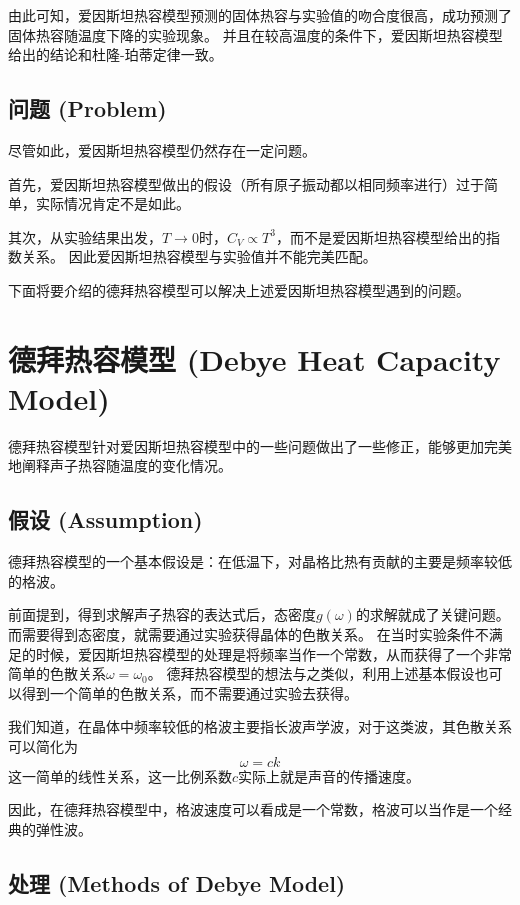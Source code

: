 \documentclass[declarePage]{ecnuthesis}
\begin{document}
由此可知，爱因斯坦热容模型预测的固体热容与实验值的吻合度很高，成功预测了固体热容随温度下降的实验现象。%
并且在较高温度的条件下，爱因斯坦热容模型给出的结论和杜隆-珀蒂定律一致。

\subsection{问题 (Problem)}

尽管如此，爱因斯坦热容模型仍然存在一定问题。

首先，爱因斯坦热容模型做出的假设（所有原子振动都以相同频率进行）过于简单，实际情况肯定不是如此。

其次，从实验结果出发，$T \rightarrow 0$时，$C_V \propto T^3$，而不是爱因斯坦热容模型给出的指数关系。%
因此爱因斯坦热容模型与实验值并不能完美匹配。

下面将要介绍的德拜热容模型可以解决上述爱因斯坦热容模型遇到的问题。

\section{德拜热容模型 (Debye Heat Capacity Model)}

德拜热容模型针对爱因斯坦热容模型中的一些问题做出了一些修正，能够更加完美地阐释声子热容随温度的变化情况。

\subsection{假设 (Assumption)}

德拜热容模型的一个基本假设是：在低温下，对晶格比热有贡献的主要是频率较低的格波。

前面提到，得到求解声子热容的表达式后，态密度$g(\omega)$的求解就成了关键问题。%
而需要得到态密度，就需要通过实验获得晶体的色散关系。%
在当时实验条件不满足的时候，爱因斯坦热容模型的处理是将频率当作一个常数，从而获得了一个非常简单的色散关系$\omega = \omega_0$。%
德拜热容模型的想法与之类似，利用上述基本假设也可以得到一个简单的色散关系，而不需要通过实验去获得。

我们知道，在晶体中频率较低的格波主要指长波声学波，对于这类波，其色散关系可以简化为
\begin{equation}
    \omega=ck
\end{equation}
这一简单的线性关系，这一比例系数$c$实际上就是声音的传播速度。

因此，在德拜热容模型中，格波速度可以看成是一个常数，格波可以当作是一个经典的弹性波。

\subsection{处理 (Methods of Debye Model)}
\end{document}
